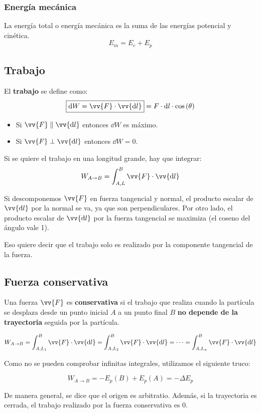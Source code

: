 \documentclass[a4paper]{book}
\numberwithin{figure}{chapter}
\numberwithin{equation}{chapter}
\renewcommand{\vec}[1]{\vv{{#1}}}
\begin{document}
\subsubsection{Energía mecánica}
La energía total o energía mecánica es la suma de las energías potencial y cinética.
\[\boxed{E_m = E_c + E_p}\]

\subsection{Trabajo}
\label{subsec:trabajo}
El \textbf{trabajo} se define como: \[\boxed{\dd{W} = \vec{F}\cdot \vec{\dd{l}}} = F\cdot \dd{l}\cdot \cos{\left( \theta \right)}\]

\begin{itemize}
	\item Si $\vec{F}\parallel \vec{\dd l}$ entonces $\dd W$ es máximo.
	\item Si $\vec{F}\perp \vec{\dd l}$ entonces $\dd W = 0$.
\end{itemize}

Si se quiere el trabajo en una longitud grande, hay que integrar: \[W_{A\to B} = \int_{A,L}^B{\vec{F}\cdot \vec{\dd l}}\]

Si descomponemos  $\vec{F}$ en fuerza tangencial y normal, el producto escalar de $\vec{\dd l}$ por la normal se va, ya que son perpendiculares. Por otro lado, el producto escalar de $\vec{\dd l}$ por la fuerza tangencial se maximiza (el coseno  del ángulo vale 1).

Eso quiere decir que el trabajo solo es realizado por la componente tangencial de la fuerza.

\subsection{Fuerza conservativa}
\label{subsec:fuerza_conservativa}
Una fuerza $\vec{F}$ es \textbf{conservativa} si el trabajo que realiza cuando la partícula se desplaza desde un punto inicial $A$ a un punto final $B$ \textbf{no depende de la trayectoria} seguida por la partícula.

\[W_{A\to B} = \int_{A,L_1}^{B}{\vec{F}\cdot \vec{\dd l}}= \int_{A,L_2}^{B}{\vec{F}\cdot \vec{\dd l}} = \dots = \int_{A,L_n}^{B}{\vec{F}\cdot \vec{\dd l}}\]

Como no se pueden comprobar infinitas integrales, utilizamos el siguiente truco:

\[W_{A\to B} = - E_p(B) + E_p(A) = -\Delta E_p\]

De manera general, se dice que el origen es arbitratio. Además, si la trayectoria es cerrada, el trabajo realizado por la fuerza conservativa es 0.
\end{document}
